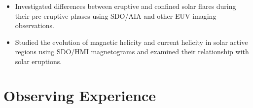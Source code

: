 \documentclass{resume}
\begin{document}
\begin{itemize}
\item Investigated differences between eruptive and confined solar flares during their pre-eruptive phases using SDO/AIA and other EUV imaging observations.
\item Studied the evolution of magnetic helicity and current helicity in solar active regions using SDO/HMI magnetograms and examined their relationship with solar eruptions.
\end{itemize}
\section{Observing Experience}





\newpage
\end{document}
